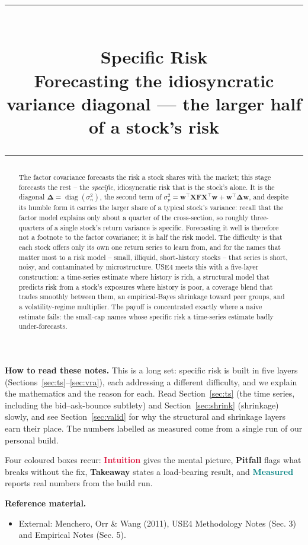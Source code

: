 \documentclass[11pt]{article}
\title{\vspace{-2.2em}
  {\color{steel}\rule{\textwidth}{1.3pt}}\\[0.7em]
  \Huge\bfseries Specific Risk\\[0.35em]
  \large\mdseries Forecasting the idiosyncratic variance diagonal --- the larger half of a stock's risk\\[0.4em]
  {\color{steel}\rule{\textwidth}{0.7pt}}}
\author{}
\date{}
\theoremstyle{definition}
\theoremstyle{plain}
\theoremstyle{remark}
\DeclareMathOperator{\diag}{diag}
\newcommand{\T}{^{\!\top}}
\newcommand{\wvec}{\mathbf{w}}
\newcommand{\Xmat}{\mathbf{X}}
\newcommand{\Fmat}{\mathbf{F}}
\newcommand{\Del}{\boldsymbol{\Delta}}
\begin{document}
\maketitle
\thispagestyle{empty}

\begin{abstract}
The factor covariance forecasts the risk a stock shares with the market; this stage forecasts the rest -- the \emph{specific}, idiosyncratic risk that is the stock's alone. It is the diagonal $\Del=\diag(\sigma_n^2)$, the second term of $\sigma_p^2 = \wvec\T\Xmat\Fmat\Xmat\T\wvec + \wvec\T\Del\wvec$, and despite its humble form it carries the larger share of a typical stock's variance: recall that the factor model explains only about a quarter of the cross-section, so roughly three-quarters of a single stock's return variance is specific. Forecasting it well is therefore not a footnote to the factor covariance; it is half the risk model. The difficulty is that each stock offers only its own one return series to learn from, and for the names that matter most to a risk model -- small, illiquid, short-history stocks -- that series is short, noisy, and contaminated by microstructure. USE4 meets this with a five-layer construction: a time-series estimate where history is rich, a structural model that predicts risk from a stock's exposures where history is poor, a coverage blend that trades smoothly between them, an empirical-Bayes shrinkage toward peer groups, and a volatility-regime multiplier. The payoff is concentrated exactly where a naive estimate fails: the small-cap names whose specific risk a time-series estimate badly under-forecasts.
\end{abstract}

\begin{tcolorbox}[colback=paperlt,colframe=ink!30,boxrule=0.4pt,arc=2pt,left=10pt,right=10pt,top=8pt,bottom=8pt]
\textbf{How to read these notes.} This is a long set: specific risk is built in five layers (Sections~\ref{sec:ts}--\ref{sec:vra}), each addressing a different difficulty, and we explain the mathematics and the reason for each. Read Section~\ref{sec:ts} (the time series, including the bid--ask-bounce subtlety) and Section~\ref{sec:shrink} (shrinkage) slowly, and see Section~\ref{sec:valid} for why the structural and shrinkage layers earn their place. The numbers labelled as measured come from a single run of our personal build.

\smallskip
Four coloured boxes recur: \textcolor{crimson}{\textbf{Intuition}} gives the mental picture, \textcolor{amber}{\textbf{Pitfall}} flags what breaks without the fix, \textcolor{steel}{\textbf{Takeaway}} states a load-bearing result, and \textcolor{teal}{\textbf{Measured}} reports real numbers from the build run.

\smallskip
\textbf{Reference material.}
\begin{itemize}[leftmargin=1.4em,topsep=2pt]
  \item External: Menchero, Orr \& Wang (2011), USE4 Methodology Notes (Sec. 3) and Empirical Notes (Sec. 5).
\end{itemize}
\end{tcolorbox}
\end{document}
